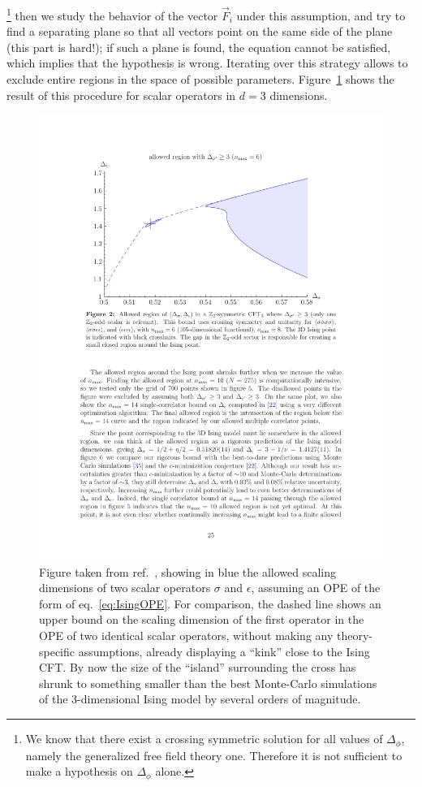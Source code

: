 \documentclass[a4paper,12pt]{article}
\numberwithin{equation}{section}
\begin{document}
%
\footnote{We know that there exist a crossing symmetric solution for all values of $\Delta_\phi$, namely the generalized free field theory one. Therefore it is not sufficient to make a hypothesis on $\Delta_\phi$ alone.} 
%
then we study the behavior of the vector $\vec{F}_i$ under this assumption, and try to find a separating plane so that all vectors point on the same side of the plane
(this part is hard!); if such a plane is found, the equation cannot be satisfied, which implies that the hypothesis is wrong.
Iterating over this strategy allows to exclude entire regions in the space of possible parameters. Figure~\ref{fig:Ising:island} shows the result of this procedure for scalar operators in $d = 3$ dimensions. 
\begin{figure}
	\centering
	\includegraphics[width=0.8\linewidth]{figures/IsingIsland.pdf}
	\caption{Figure taken from ref.~\cite{Kos:2014bka}, showing
	in blue the allowed scaling dimensions of two scalar operators
	$\sigma$ and $\epsilon$,
	assuming an OPE of the form of eq.~\eqref{eq:IsingOPE}.
	For comparison, the dashed line shows an upper bound on the
	scaling dimension of the first operator in the OPE of
	two identical scalar operators, without making any 
	theory-specific assumptions, already displaying a ``kink''
	close to the Ising CFT.
	By now the size of the ``island'' surrounding the cross
	has shrunk to something smaller than the best Monte-Carlo
	simulations of the 3-dimensional Ising model by several
	orders of magnitude.}
	\label{fig:Ising:island}
\end{figure}
\end{document}

